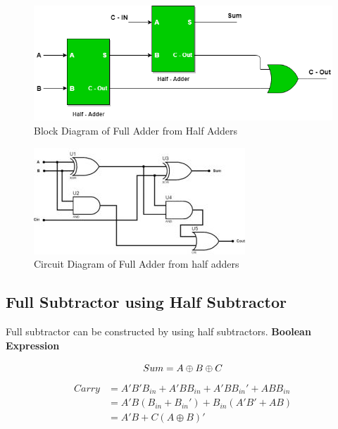 \documentclass[a4paper, 12pt]{article}
\begin{document}
\begin{figure}[h]
	\centering
	\includegraphics[scale=0.6]{half-adder-from-full-block.png}
	\caption{Block Diagram of Full Adder from Half Adders}
\end{figure}
\begin{figure}[h]
	\centering
	\includegraphics[scale=1]{full-adder-from-half-circuit.jpg}
	\caption{Circuit Diagram of Full Adder from half adders}
\end{figure}

\pagebreak
\subsection{Full Subtractor using Half Subtractor}
Full subtractor can be constructed by using half subtractors. 
\textbf{Boolean Expression}

\begin{equation}
	Sum = A\oplus B \oplus C \\
\end{equation}
\begin{equation}
\begin{split}
	Carry &= A'B'B_{in} + A'BB_{in} + A'BB_{in}' + ABB_{in} \\
				&= A'B(B_{in} + B_{in}') + B_{in}(A'B' + AB) \\
				& = A'B + C(A \oplus B)' \\
\end{split}
\end{equation}
\end{document}
